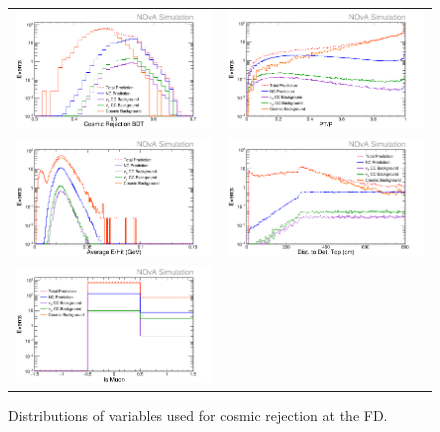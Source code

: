 \begin{figure}[htb]
  \centering
  \begin{tabular}{c c}
    \includegraphics[width=.47\textwidth]{figures/SelNP1/NP1NmCP.png} &
    \includegraphics[width=.47\textwidth]{figures/SelNP1/NP1PPTP.png} \\
    \includegraphics[width=.47\textwidth]{figures/SelNP1/NP1EHit.png} &
    \includegraphics[width=.47\textwidth]{figures/SelNP1/NP1DistTop.png} \\
    \includegraphics[width=.47\textwidth]{figures/SelNP1/NP1IsMu.png} & \\
  \end{tabular}
  \caption[Cosmic Rejection Variable Distributions]{Distributions of variables used for cosmic rejection at the FD.}
  \label{fig:CosRej}
\end{figure}

